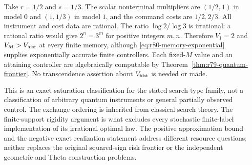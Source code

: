 \begin{example}
\label{ex:r80-rational-nonsaturation}
Take $r=1/2$ and $s=1/3$.  The scalar nonterminal multipliers are
$(1/2,1)$ in model $0$ and $(1,1/3)$ in model $1$, and the
command costs are $1/2,2/3$.  All instrument and cost data are
rational.  The ratio $\log2/\log3$ is irrational: a rational
ratio would give $2^n=3^m$ for positive integers $m,n$.
Therefore $V_1=2$ and $V_M>V_{\rm hist}$ at every finite memory,
although \eqref{eq:r80-memory-exponential} supplies exponentially
accurate finite controllers.  Each fixed-$M$ value and an
attaining controller are algebraically computable by
Theorem~\ref{thm:r79-quantum-frontier}.  No transcendence assertion
about $V_{\rm hist}$ is needed or made.
\end{example}

This is an exact saturation classification for the stated
search-type family, not a classification of arbitrary quantum
instruments or general partially observed control.  The exchange
ordering is inherited from classical search theory.  The
finite-support rigidity argument is what excludes every
stochastic finite-label implementation of its irrational optimal
law.  The positive approximation bound and the negative exact
realization statement address different resource questions;
neither replaces the original squared-sign risk frontier or the
independent geometric and Theta construction problems.
